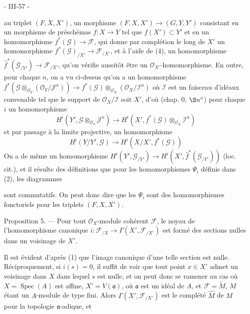 - III-57 -

au triplet $(F, X, X')$, un morphisme $(F, X, X') \to (G, Y, Y')$ consistant en un morphisme de préschémas $f: X \to Y$ tel que $f(X') \subset Y'$ et en un homomorphisme $f^*(\mathcal{G}) \to \mathcal{F}$, qui donne par complétion le long de $X'$ un homomorphisme $f^*(\mathcal{G})_{/X'} \to \mathcal{F}_{/X'}$, et à l'aide de (4), un homomorphisme $\hat{f}^*(\mathcal{G}_{/Y'}) \to \mathcal{F}_{/X'}$, qu'on vérifie aussitôt être un $\mathcal{O}_{X'}$-homomorphisme. En outre, pour chaque $n$, on a vu ci-dessus qu'on a un homomorphisme $f^*(\mathcal{G} \otimes_{\mathcal{O}_Y} (\mathcal{O}_Y/\mathcal{J}^n)) \to f^*(\mathcal{G}) \otimes_{\mathcal{O}_X} (\mathcal{O}_X/\mathcal{I}^n)$ où $\mathcal{I}$ est un faisceau d'idéaux convenable tel que le support de $\mathcal{O}_X/\mathcal{I}$ soit $X'$, d'où (chap. 0, $\S n^\circ$) pour chaque $i$ un homomorphisme
$$H^i(Y', \mathcal{G} \otimes_{\mathcal{O}_Y} \mathcal{J}^n) \to H^i(X', f^*(\mathcal{G}) \otimes_{\mathcal{O}_X} \mathcal{I}^n)$$
et par passage à la limite projective, un homomorphisme
$$H^i(Y/Y', \mathcal{G}) \to H^i(X/X', f^*(\mathcal{G}))$$
On a de même un homomorphisme $H^i(Y', \mathcal{G}_{/Y'}) \to H^i(X', \hat{f}^*(\mathcal{G}_{/Y'}))$ (loc. cit.), et il résulte des définitions que pour les homomorphismes $\Psi_i$ définis dans (2), les diagrammes
sont commutatifs. On peut donc dire que les $\Psi_i$ sont des homomorphismes fonctoriels pour les triplets $(F, X, X')$.

Proposition 5. — Pour tout $\mathcal{O}_X$-module cohérent $\mathcal{F}$, le noyau de l'homomorphisme canonique $i: \mathcal{F}_{/X} \to \Gamma(X', \mathcal{F}_{/X'})$ est formé des sections nulles dans un voisinage de $X'$.

Il est évident d'après (1) que l'image canonique d'une telle section est nulle. Réciproquement, si $i(s) = 0$, il suffit de voir que tout point $x \in X'$ admet un voisinage dans $X$ dans lequel $s$ est nulle, et on peut donc se ramener au cas où $X = \operatorname{Spec}(A)$ est affine, $X' = V(\mathfrak{a})$, où $\mathfrak{a}$ est un idéal de $A$, et $\mathcal{F} = \tilde{M}$, $M$ étant un $A$-module de type fini. Alors $\Gamma(X', \mathcal{F}_{/X'})$ est le complété $\hat{M}$ de $M$ pour la topologie $\mathfrak{a}$-adique, et

